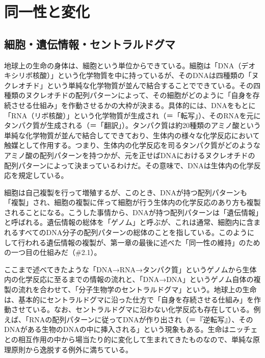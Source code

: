 \section{同一性と変化}\label{ux7b2cux4e8cux7ae0ux540cux4e00ux6027ux3068ux5909ux5316}

\subsection{細胞・遺伝情報・セントラルドグマ}\label{ux7d30ux80deux907aux4f1dux60c5ux5831ux30bbux30f3ux30c8ux30e9ux30ebux30c9ux30b0ux30de}

地球上の生命の身体は、細胞という単位からできている。細胞は「DNA（デオキシリボ核酸）」という化学物質を中に持っているが、そのDNAは四種類の「ヌクレオチド」という単純な化学物質が並んで結合することでできている。その四種類のヌクレオチドの配列パターンによって、その細胞がどのように「自身を存続させる仕組み」を作動させるかの大枠が決まる。具体的には、DNAをもとに「RNA（リボ核酸）」という化学物質が生成され（＝「転写」）、そのRNAを元にタンパク質が生成される（＝「翻訳」）。タンパク質は約20種類のアミノ酸という単純な化学物質が並んで結合してできており、生体内の様々な化学反応において触媒として作用する。つまり、生体内の化学反応を司るタンパク質がどのようなアミノ酸の配列パターンを持つかが、元を正せばDNAにおけるヌクレオチドの配列パターンによって決まっているわけだ。その意味で、DNAは生体内の化学反応を規定している。

細胞は自己複製を行って増殖するが、このとき、DNAが持つ配列パターンも「複製」され、細胞の複製に伴って細胞が行う生体内の化学反応のあり方も複製されることになる。こうした事情から、DNAが持つ配列パターンは「遺伝情報」と呼ばれる。遺伝情報の総体を「ゲノム」と呼ぶが、これは通常、細胞内に含まれるすべてのDNA分子の配列パターンの総体のことを指している。このようにして行われる遺伝情報の複製が、第一章の最後に述べた「同一性の維持」のための一つ目の仕組みだ（\#2.1）。

ここまで述べてきたような「DNA→RNA→タンパク質」というゲノムから生体内の化学反応に至るまでの情報の流れと、「DNA→DNA」というゲノム自体の複製の流れを合わせて、「分子生物学のセントラルドグマ」という。地球上の生命は、基本的にセントラルドグマに沿った仕方で「自身を存続させる仕組み」を作動させている。なお、セントラルドグマに沿わない化学反応も存在している。例えば、「RNAの配列パターンに従ってDNAが作り出され（＝『逆転写』）、そのDNAがある生物のDNAの中に挿入される」という現象もある。生命はニッチェとの相互作用の中から場当たり的に変化して生まれてきたものなので、単純な原理原則から逸脱する例外に満ちている。

